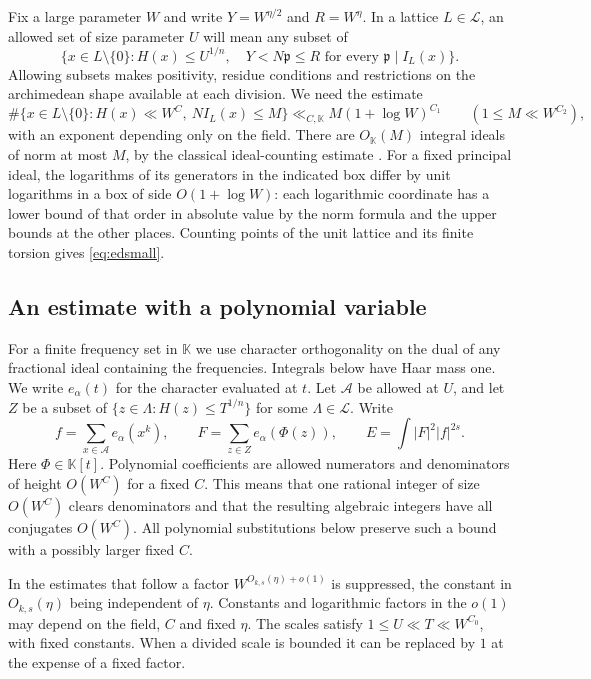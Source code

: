 \documentclass[11pt,letterpaper]{article}
\theoremstyle{definition}
\numberwithin{equation}{section}
\begin{document}
Fix a large parameter $W$ and write $Y=W^{\eta/2}$ and $R=W^\eta$.
In a lattice $L\in\mathcal L$, an allowed set of size parameter $U$
will mean any subset of
\[
 \{x\in L\setminus\{0\}:H(x)\le U^{1/n},
       \quad Y<N\mathfrak p\le R\text{ for every }\mathfrak p\mid I_L(x)\}.
\]
Allowing subsets makes positivity, residue conditions and restrictions
on the archimedean shape available at each division. We need the estimate
\begin{equation}\label{eq:edsmall}
 \#\{x\in L\setminus\{0\}:H(x)\ll W^C,\ NI_L(x)\le M\}
             \ll_{C,\mathbb K} M(1+\log W)^{C_1}
                \qquad (1\le M\ll W^{C_2}),
\end{equation}
with an exponent depending only on the field. There are $O_{\mathbb K}(M)$
integral ideals of norm at most $M$, by the classical ideal-counting
estimate \cite{ednark}. For a fixed principal ideal, the logarithms of
its generators in the indicated box differ by unit logarithms in a box
of side $O(1+\log W)$: each logarithmic coordinate has a lower bound of
that order in absolute value by the norm formula and the upper bounds
at the other places. Counting points of the unit lattice and its finite
torsion gives \eqref{eq:edsmall}.

\subsection{An estimate with a polynomial variable}
For a finite frequency set in $\mathbb K$ we use character orthogonality
on the dual of any fractional ideal containing the frequencies. Integrals
below have Haar mass one. We write $e_\alpha(t)$ for the character
evaluated at $t$. Let $\mathcal A$ be allowed at $U$, and let $Z$ be a
subset of $\{z\in\Lambda:H(z)\le T^{1/n}\}$ for some
$\Lambda\in\mathcal L$. Write
\[
 f=\sum_{x\in\mathcal A}e_\alpha(x^k),\qquad
 F=\sum_{z\in Z}e_\alpha(\Phi(z)),\qquad E=\int |F|^2|f|^{2s}.
\]
Here $\Phi\in\mathbb K[t]$. Polynomial coefficients are allowed
numerators and denominators of height $O(W^C)$ for a fixed $C$.
This means that one rational integer of size $O(W^C)$ clears
denominators and that the resulting algebraic integers have all
conjugates $O(W^C)$. All polynomial substitutions below preserve such
a bound with a possibly larger fixed $C$.

In the estimates that follow a factor $W^{O_{k,s}(\eta)+o(1)}$ is
suppressed, the constant in $O_{k,s}(\eta)$ being independent of
$\eta$. Constants and logarithmic factors in the $o(1)$ may depend on
the field, $C$ and fixed $\eta$. The scales satisfy
$1\le U\ll T\ll W^{C_0}$, with fixed constants. When a divided scale
is bounded it can be replaced by $1$ at the expense of a fixed factor.
\end{document}
